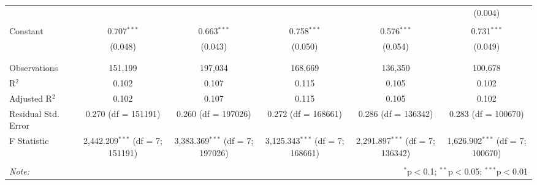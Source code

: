\begin{table}[!htbp]
\begin{adjustbox}{width=\textwidth}
\begin{tabular}{@{\extracolsep{5pt}}lccccc}
  &  &  &  &  & (0.004) \\ 
  & & & & & \\ 
 Constant & 0.707$^{***}$ & 0.663$^{***}$ & 0.758$^{***}$ & 0.576$^{***}$ & 0.731$^{***}$ \\ 
  & (0.048) & (0.043) & (0.050) & (0.054) & (0.049) \\ 
  & & & & & \\ 
\hline \\[-1.8ex] 
Observations & 151,199 & 197,034 & 168,669 & 136,350 & 100,678 \\ 
R$^{2}$ & 0.102 & 0.107 & 0.115 & 0.105 & 0.102 \\ 
Adjusted R$^{2}$ & 0.102 & 0.107 & 0.115 & 0.105 & 0.102 \\ 
Residual Std. Error & 0.270 (df = 151191) & 0.260 (df = 197026) & 0.272 (df = 168661) & 0.286 (df = 136342) & 0.283 (df = 100670) \\ 
F Statistic & 2,442.209$^{***}$ (df = 7; 151191) & 3,383.369$^{***}$ (df = 7; 197026) & 3,125.343$^{***}$ (df = 7; 168661) & 2,291.897$^{***}$ (df = 7; 136342) & 1,626.902$^{***}$ (df = 7; 100670) \\ 
\hline 
\hline \\[-1.8ex] 
\textit{Note:}  & \multicolumn{5}{r}{$^{*}$p$<$0.1; $^{**}$p$<$0.05; $^{***}$p$<$0.01} \\ 
\end{tabular} 
\end{adjustbox}
\end{table} 
